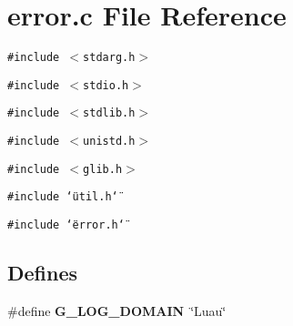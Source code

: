 \section{error.c File Reference}
\label{error_8c}
{\tt \#include $<$stdarg.h$>$}\par
{\tt \#include $<$stdio.h$>$}\par
{\tt \#include $<$stdlib.h$>$}\par
{\tt \#include $<$unistd.h$>$}\par
{\tt \#include $<$glib.h$>$}\par
{\tt \#include \char`\"{}util.h\char`\"{}}\par
{\tt \#include \char`\"{}error.h\char`\"{}}\par
\subsection*{Defines}
\begin{CompactItemize}
\item 
\#define {\bf G\_\-LOG\_\-DOMAIN}\ \char`\"{}Luau\char`\"{}
\end{CompactItemize}
